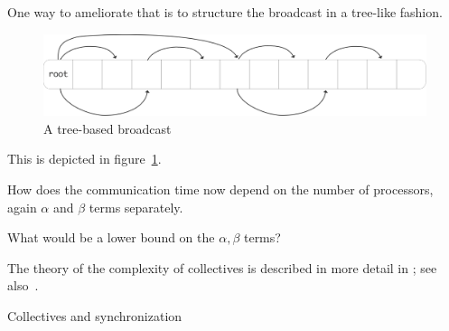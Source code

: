 One way to ameliorate that is to structure the
broadcast in a tree-like fashion.
\begin{figure}[ht]
  \includegraphics[scale=.1]{graphics/bcast-tree}
  \caption{A tree-based broadcast}
  \label{fig:bcast-tree}
\end{figure}
This is depicted in figure~\ref{fig:bcast-tree}.

\begin{exercise}
  \label{ex:latencylog}
  How does the
  communication time now depend on the number of processors, again
  $\alpha$ and $\beta$ terms separately.

  What would be a lower bound on the $\alpha,\beta$ terms?
\end{exercise}

The theory
of the complexity of collectives is described in more detail in
; see also~\cite{Chan2007Collective}.

 {Collectives and synchronization}

